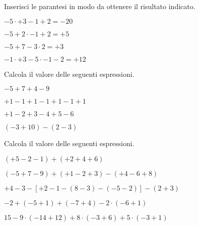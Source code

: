 \begin{esercizio}
Inserisci le parantesi in modo da ottenere il risultato indicato.

\vspace{-.5em}
 \begin{htmulticols}{2}
 \begin{enumeratees}
 \item \(-5 \cdot +3-1+2=-20\)
 \item \(-5+2\cdot-1+2=+5\)
 \item \(-5+7-3\cdot 2=+3\)
 \item \(-1\cdot +3-5\cdot -1-2=+12\)
 \end{enumeratees}
 \end{htmulticols}
\end{esercizio}

\begin{esercizio}
Calcola il valore delle seguenti espressioni.

\vspace{-.5em}
 \begin{htmulticols}{2}
 \begin{enumeratees}
 \item \(-5+7+4-9\)
 \item \(+1-1+1-1+1-1+1\)
 \item \(+1-2+3-4+5-6\)
 \item \((-3+10)-(2-3)\)
 \end{enumeratees}
 \end{htmulticols}
\end{esercizio}

\begin{esercizio} %
Calcola il valore delle seguenti espressioni.
 \begin{enumeratees}
 \item \((+5-2-1)+(+2+4+6)\)  
 \item \((-5+7-9)+(+1-2+3)-(+4-6+8)\)  
 \item \(+4-3-[+2-1-(8-3)-(-5-2)]-(2+3)\)  
 \item \(-2+(-5+1)+(-7+4)-2 \cdot (-6+1)\)  
 \item \(15-9 \cdot (-14+12)+8 \cdot (-3+6)+ 5 \cdot(-3+1)\)  
 \end{enumeratees}
\end{esercizio}

